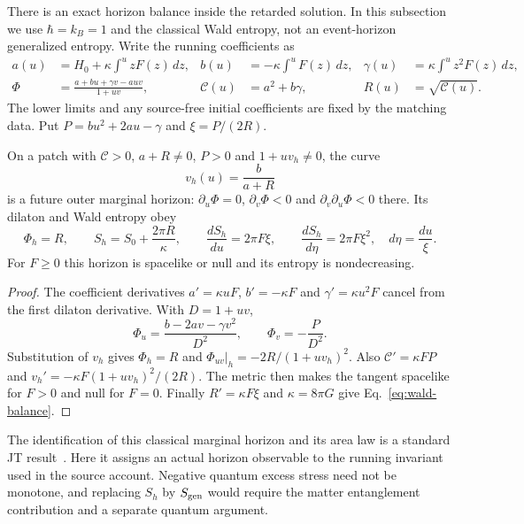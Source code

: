 There is an exact horizon balance inside the retarded solution. In this subsection
we use $\hbar=k_B=1$ and the classical Wald entropy, not an event-horizon
generalized entropy. Write the running coefficients as
\begin{align}
 a(u)&=H_0+\kappa\int^u zF(z)\,dz,&
 b(u)&=-\kappa\int^u F(z)\,dz,&
 \gamma(u)&=\kappa\int^u z^2F(z)\,dz,\nonumber\\
 \Phi&=\frac{a+bu+\gamma v-auv}{1+uv},&
 \mathcal C(u)&=a^2+b\gamma,& R(u)&=\sqrt{\mathcal C(u)}.
 \label{eq:running-coeff}
\end{align}
The lower limits and any source-free initial coefficients are fixed by the
matching data. Put $P=bu^2+2au-\gamma$ and $\xi=P/(2R)$.

\begin{proposition}\label{prop:horizon-balance}
On a patch with $\mathcal C>0$, $a+R\ne0$, $P>0$ and $1+uv_h\ne0$, the curve
\[
 v_h(u)=\frac{b}{a+R}
\]
is a future outer marginal horizon: $\partial_u\Phi=0$,
$\partial_v\Phi<0$ and $\partial_v\partial_u\Phi<0$ there. Its dilaton and Wald
entropy obey
\begin{equation}\label{eq:wald-balance}
 \Phi_h=R,\qquad S_h=S_0+\frac{2\pi R}{\kappa},\qquad
 \frac{dS_h}{du}=2\pi F\xi,\qquad
 \frac{dS_h}{d\eta}=2\pi F\xi^2,\quad d\eta=\frac{du}{\xi}.
\end{equation}
For $F\ge0$ this horizon is spacelike or null and its entropy is nondecreasing.
\end{proposition}
\begin{proof}
The coefficient derivatives $a'=\kappa uF$, $b'=-\kappa F$ and
$\gamma'=\kappa u^2F$ cancel from the first dilaton derivative. With $D=1+uv$,
\[
 \Phi_u=\frac{b-2av-\gamma v^2}{D^2},\qquad
 \Phi_v=-\frac{P}{D^2}.
\]
Substitution of $v_h$ gives $\Phi_h=R$ and
$\Phi_{uv}|_h=-2R/(1+uv_h)^2$. Also
$\mathcal C'=\kappa FP$ and
$v_h'=-\kappa F(1+uv_h)^2/(2R)$. The metric then makes the tangent spacelike
for $F>0$ and null for $F=0$. Finally $R'=\kappa F\xi$ and $\kappa=8\pi G$
give Eq.~\eqref{eq:wald-balance}.
\end{proof}

The identification of this classical marginal horizon and its area law is a
standard JT result~\cite[Sec.~2.3.1]{Moitra2020}. Here it assigns an actual
horizon observable to the running invariant used in the source account.
Negative quantum excess stress need not be monotone, and replacing $S_h$ by
$S_{\rm gen}$ would require the matter entanglement contribution and a separate
quantum argument.

